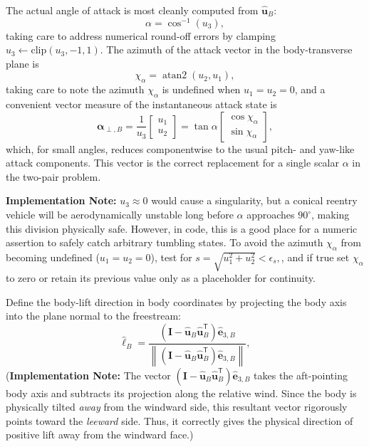 The actual angle of attack is most cleanly computed from \(\hat{\mathbf u}_B\):
\begin{equation}
\alpha=\cos^{-1}(u_3), \label{eq:aoa_scalar}
\end{equation}
taking care to address numerical round-off errors by clamping 
\(u_3\leftarrow\textrm{clip}(u_3,-1,1)\).
The azimuth of the attack vector in the body-transverse plane is
\begin{equation}
\chi_\alpha=\operatorname{atan2}(u_2,u_1), \label{eq:aoa_azimuth}
\end{equation}
taking care to note the azimuth \(\chi_\alpha\) is undefined when \(u_1=u_2=0\),
and a convenient vector measure of the instantaneous attack state is
\begin{equation}
\boldsymbol\alpha_{\perp,B}
=
\frac{1}{u_3}
\begin{bmatrix}
u_1\\[2pt]u_2
\end{bmatrix}
=
\tan\alpha
\begin{bmatrix}
\cos\chi_\alpha\\[2pt]\sin\chi_\alpha
\end{bmatrix}, \label{eq:aoa_vector}
\end{equation}
which, for small angles, reduces componentwise to the usual pitch- and yaw-like attack components. This vector is the correct replacement for a single scalar \(\alpha\) in the two-pair problem. 

\textbf{Implementation Note:} \(u_3 \approx 0\) would cause a singularity, but a conical reentry vehicle will be aerodynamically unstable long before \(\alpha\) approaches \(90^\circ\), making this division physically safe. However, in code, this is a good place for a numeric assertion to safely catch arbitrary tumbling states. To avoid the azimuth \(\chi_\alpha\) from becoming undefined (\(u_1=u_2=0\)), test for \( s=\sqrt{u_1^2+u_2^2}<\epsilon_s,\), and if true set \(\chi_\alpha\) to zero or retain its previous value only as a placeholder for continuity. 

Define the body-lift direction in body coordinates by projecting the body axis into the plane normal to the freestream:
\begin{equation}
\hat{\boldsymbol\ell}_B
=
\frac{\left(\mathbf I-\hat{\mathbf u}_B\hat{\mathbf u}_B^{\mathsf T}\right)\hat{\mathbf e}_{3,B}}
{\left\|\left(\mathbf I-\hat{\mathbf u}_B\hat{\mathbf u}_B^{\mathsf T}\right)\hat{\mathbf e}_{3,B}\right\|}, \label{eq:lift_direction}
\end{equation}
(\textbf{Implementation Note:} The vector \(\left(\mathbf I-\hat{\mathbf u}_B\hat{\mathbf u}_B^{\mathsf T}\right)\hat{\mathbf e}_{3,B}\) takes the aft-pointing body axis and subtracts its projection along the relative wind. Since the body is physically tilted \emph{away} from the windward side, this resultant vector rigorously points toward the \emph{leeward} side. Thus, it correctly gives the physical direction of positive lift away from the windward face.)

